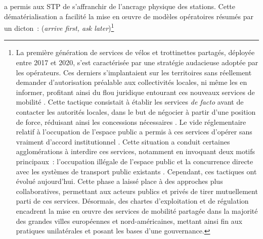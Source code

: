 \begin{refsegment}
{} a permis aux \acrfull{STP} de s’affranchir de l’ancrage physique des stations. Cette dématérialisation a facilité la mise en œuvre de modèles opératoires résumés par un dicton~: (\textsl{arrive first, ask later})\footnote{
    La première génération de services de vélos et trottinettes partagés, déployée entre 2017 et 2020, s’est caractérisée par une stratégie audacieuse adoptée par les opérateurs. Ces derniers s’implantaient sur les territoires sans réellement demander d’autorisation préalable aux collectivités locales, ni même les en informer, profitant ainsi du flou juridique entourant ces nouveaux services de mobilité \textcolor{blue}{\autocite{laker_welcome_2019}}. Cette tactique consistait à établir les services \textsl{de facto} avant de contacter les autorités locales, dans le but de négocier à partir d’une position de force, réduisant ainsi les concessions nécessaires \textcolor{blue}{\autocite[5]{lopez-escolano_mobilites_2019}}. Le vide réglementaire relatif à l’occupation de l’espace public a permis à ces services d’opérer sans vraiment d'accord institutionnel \textcolor{blue}{\autocite[5]{lopez-escolano_mobilites_2019}}. Cette situation a conduit certaines agglomérations à interdire ces services, notamment en invoquant deux motifs principaux~: l’occupation illégale de l’espace public et la concurrence directe avec les systèmes de transport public existants \textcolor{blue}{\autocite[63]{6t-bureau_de_recherche_livre_2019}}. Cependant, ces tactiques ont évolué aujourd'hui. Cette phase a laissé place à des approches plus collaboratives, permettant aux acteurs publics et privés de tirer mutuellement parti de ces services. Désormais, des chartes d'exploitation et de régulation encadrent la mise en œuvre des services de mobilité partagée dans la majorité des grandes villes européennes et nord-américaines, mettant ainsi fin aux pratiques unilatérales et posant les bases d’une gouvernance.
}
\end{refsegment}
